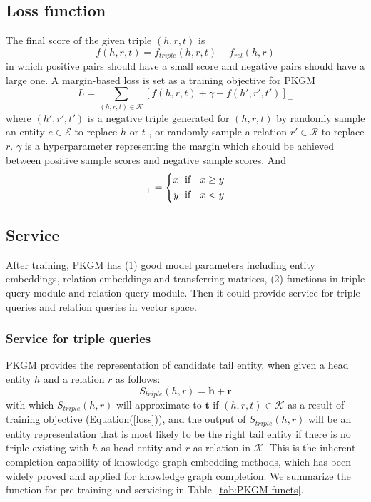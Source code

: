\subsection{Loss function}
The final score of the given triple $(h,r, t)$ is 
\begin{equation}
    f(h,r,t) = f_{triple}(h,r,t) + f_{rel}(h,r)
\end{equation}
in which positive pairs should have a small score and negative pairs should have a large one. A margin-based loss is set as a training objective for PKGM
\begin{equation}
L = \sum_{(h,r,t) \in \mathcal{K}}  [f(h,r,t) + \gamma - f(h',r',t') ]_+
\label{loss}
\end{equation}
where $(h',r',t')$ is a negative triple generated for $(h,r,t)$ by randomly sample an entity $e \in \mathcal{E}$ to replace $h$ or $t$ , or randomly sample a relation $r' \in \mathcal{R}$ to replace $r$. $\gamma$ is a hyperparameter representing the margin which should be achieved between  positive sample scores and negative sample scores. And 
\begin{equation}
[x, y]_+=\left\{
\begin{aligned}
x &  \text{\; if \; } x \ge y \\
y & \text{\; if \; } x < y 
\end{aligned}
\right.
\end{equation}

\subsection{Service}
After training, PKGM has (1) good model parameters including entity embeddings, relation embeddings and transferring matrices, (2) functions in  triple query module and relation query module. Then it could provide service for triple queries and relation queries in vector space. 

\subsubsection{Service for triple queries}
PKGM provides the representation of candidate tail entity, when given a head entity $h$ and a relation $r$ as follows:
\begin{equation}
    S_{triple}(h,r) = \mathbf{h} + \mathbf{r} 
\end{equation}
with which $S_{triple}(h,r)$ will approximate to $\mathbf{t}$ if $(h,r,t) \in \mathcal{K}$ as a result of training objective (Equation(\ref{loss})), and the output of $S_{triple}(h,r)$ will be an entity representation that is most likely to be the right tail entity if there is no triple existing with $h$ as head entity and $r$ as relation in $\mathcal{K}$. This is the inherent completion capability of knowledge graph embedding methods, which has been widely proved and applied for knowledge graph completion\cite{DBLP:journals/corr/abs-2002-00388}. We summarize the function for pre-training and servicing in Table~\ref{tab:PKGM-functs}.

